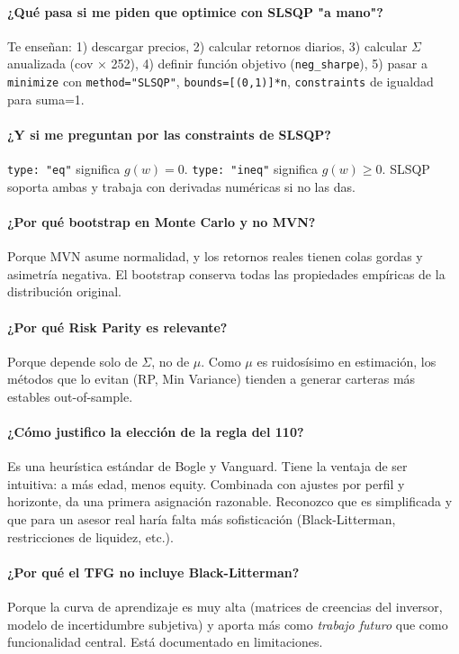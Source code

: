 \documentclass[11pt,a4paper]{book}
\begin{document}
\paragraph{¿Qué pasa si me piden que optimice con SLSQP "a mano"?}
Te enseñan: 1) descargar precios, 2) calcular retornos diarios, 3) calcular $\Sigma$ anualizada (cov × 252), 4) definir función objetivo (\texttt{neg\_sharpe}), 5) pasar a \texttt{minimize} con \texttt{method="SLSQP"}, \texttt{bounds=[(0,1)]*n}, \texttt{constraints} de igualdad para suma=1.

\paragraph{¿Y si me preguntan por las constraints de SLSQP?}
\texttt{type: "eq"} significa $g(w) = 0$. \texttt{type: "ineq"} significa $g(w) \ge 0$. SLSQP soporta ambas y trabaja con derivadas numéricas si no las das.

\paragraph{¿Por qué bootstrap en Monte Carlo y no MVN?}
Porque MVN asume normalidad, y los retornos reales tienen colas gordas y asimetría negativa. El bootstrap conserva todas las propiedades empíricas de la distribución original.

\paragraph{¿Por qué Risk Parity es relevante?}
Porque depende solo de $\Sigma$, no de $\mu$. Como $\mu$ es ruidosísimo en estimación, los métodos que lo evitan (RP, Min Variance) tienden a generar carteras más estables out-of-sample.

\paragraph{¿Cómo justifico la elección de la regla del 110?}
Es una heurística estándar de Bogle y Vanguard. Tiene la ventaja de ser intuitiva: a más edad, menos equity. Combinada con ajustes por perfil y horizonte, da una primera asignación razonable. Reconozco que es simplificada y que para un asesor real haría falta más sofisticación (Black-Litterman, restricciones de liquidez, etc.).

\paragraph{¿Por qué el TFG no incluye Black-Litterman?}
Porque la curva de aprendizaje es muy alta (matrices de creencias del inversor, modelo de incertidumbre subjetiva) y aporta más como \emph{trabajo futuro} que como funcionalidad central. Está documentado en limitaciones.
\end{document}
